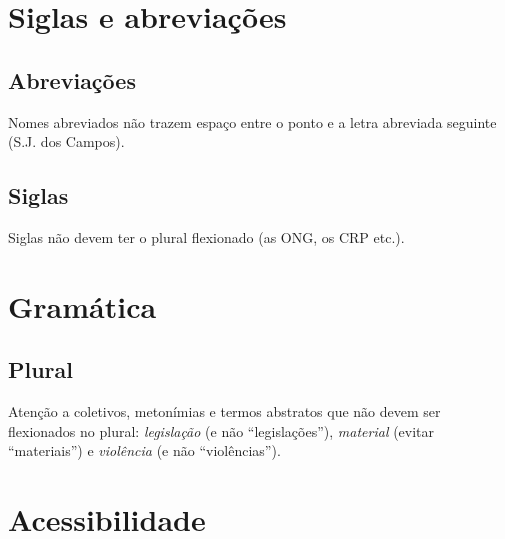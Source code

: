 \section{Siglas e abreviações}

\subsection{Abreviações}

Nomes abreviados não trazem espaço entre o ponto e a letra abreviada seguinte (S.J. dos Campos).

\subsection{Siglas}

Siglas não devem ter o plural flexionado (as ONG, os CRP etc.).

\section{Gramática}

\subsection{Plural}

Atenção a coletivos, metonímias e termos abstratos que não devem ser flexionados no plural: \emph{legislação} (e não ``legislações''), \emph{material} (evitar ``materiais'') e \emph{violência} (e não ``violências'').

\section{Acessibilidade}\label{acessibilidade}

